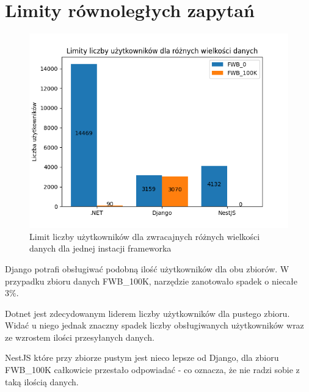 \section{Limity równoległych zapytań}

\begin{figure}[!hb]
	\centering \includegraphics[width=1\linewidth]{rysunki/Limit_vus_for_different_datasets.png}
	\caption{Limit liczby użytkowników dla zwracajnych różnych wielkości danych dla jednej instacji frameworka}
	\label{rys:limit_vus}
\end{figure}

Django potrafi obsługiwać podobną ilość użytkowników dla obu zbiorów.
W przypadku zbioru danych FWB\_100K, narzędzie zanotowało spadek o niecałe 3\%.

Dotnet jest zdecydowanym liderem liczby użytkowników dla pustego zbioru. 
Widać u niego jednak znaczny spadek liczby obsługiwanych użytkowników wraz ze wzrostem ilości przesyłanych danych.

NestJS które przy zbiorze pustym jest nieco lepsze od Django, dla zbioru FWB\_100K całkowicie przestało odpowiadać - co oznacza, że nie radzi sobie z taką ilością danych.

